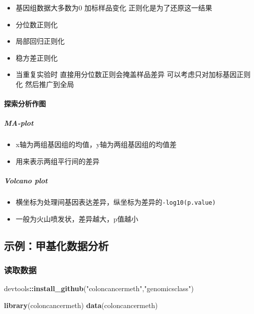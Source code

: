\documentclass[
]{book}
\newenvironment{Shaded}{\begin{snugshade}}{\end{snugshade}}
\newcommand{\KeywordTok}[1]{\textcolor[rgb]{0.13,0.29,0.53}{\textbf{#1}}}
\newcommand{\NormalTok}[1]{#1}
\newcommand{\OperatorTok}[1]{\textcolor[rgb]{0.81,0.36,0.00}{\textbf{#1}}}
\newcommand{\StringTok}[1]{\textcolor[rgb]{0.31,0.60,0.02}{#1}}
\providecommand{\tightlist}{%
  \setlength{\itemsep}{0pt}\setlength{\parskip}{0pt}}
\begin{document}
\begin{itemize}
\tightlist
\item
  基因组数据大多数为0 加标样品变化 正则化是为了还原这一结果
\item
  分位数正则化
\item
  局部回归正则化
\item
  稳方差正则化
\item
  当重复实验时 直接用分位数正则会掩盖样品差异 可以考虑只对加标基因正则化 然后推广到全局
\end{itemize}

\hypertarget{ux63a2ux7d22ux5206ux6790ux4f5cux56fe}{%
\paragraph{探索分析作图}\label{ux63a2ux7d22ux5206ux6790ux4f5cux56fe}}

\hypertarget{ma-plot}{%
\subparagraph{MA-plot}\label{ma-plot}}

\begin{itemize}
\tightlist
\item
  x轴为两组基因组的均值，y轴为两组基因组的均值差
\item
  用来表示两组平行间的差异
\end{itemize}

\hypertarget{volcano-plot}{%
\subparagraph{Volcano plot}\label{volcano-plot}}

\begin{itemize}
\tightlist
\item
  横坐标为处理间基因表达差异，纵坐标为差异的\texttt{-log10(p.value)}
\item
  一般为火山喷发状，差异越大，p值越小
\end{itemize}

\hypertarget{ux793aux4f8bux7532ux57faux5316ux6570ux636eux5206ux6790}{%
\subsection{示例：甲基化数据分析}\label{ux793aux4f8bux7532ux57faux5316ux6570ux636eux5206ux6790}}

\hypertarget{ux8bfbux53d6ux6570ux636e}{%
\subsubsection{读取数据}\label{ux8bfbux53d6ux6570ux636e}}

\begin{Shaded}
\begin{Highlighting}[]
\NormalTok{devtools}\OperatorTok{::}\KeywordTok{install_github}\NormalTok{(}\StringTok{"coloncancermeth"}\NormalTok{,}\StringTok{"genomicsclass"}\NormalTok{)}

\KeywordTok{library}\NormalTok{(coloncancermeth)}
\KeywordTok{data}\NormalTok{(coloncancermeth)}
\end{Highlighting}
\end{Shaded}
\end{document}
